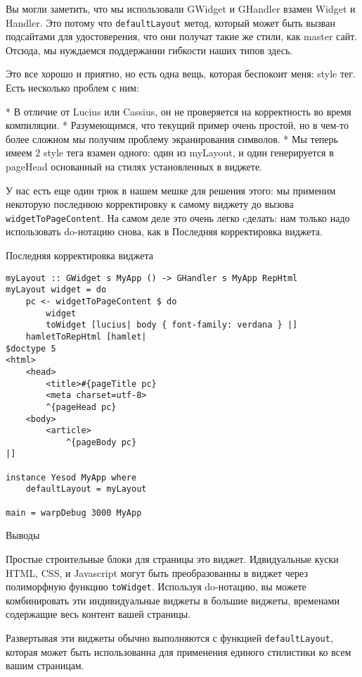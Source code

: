 Вы могли заметить, что мы использовали GWidget и GHandler взамен Widget и Handler. Это потому что \lstinline'defaultLayout' метод, который может быть вызван подсайтами для удостоверения, что они получат такие же стили, как master сайт. Отсюда, мы нуждаемся поддержании гибкости наших типов здесь.

Это все хорошо и приятно, но есть одна вещь, которая беспокоит меня: style тег. Есть несколько проблем с ним:

* В отличие от Lucius или Cassius, он не проверяется на корректность во время компиляции.
* Разумеющимся, что текущий пример очень простой, но в чем-то более сложном мы получим проблему экранирования символов.
* Мы теперь имеем 2 style тега взамен одного: один из myLayout, и один генерируется в pageHead основанный на стилях установленных в виджете.

У нас есть еще один трюк в нашем мешке для решения этого: мы применим некоторую последнюю корректировку к самому виджету до вызова \lstinline'widgetToPageContent'. На самом деле это очень легко cделать: нам только надо использовать do-нотацию снова, как в Последняя корректировка виджета.

Последняя корректировка виджета

\begin{lstlisting}
myLayout :: GWidget s MyApp () -> GHandler s MyApp RepHtml
myLayout widget = do
    pc <- widgetToPageContent $ do
        widget
        toWidget [lucius| body { font-family: verdana } |]
    hamletToRepHtml [hamlet|
$doctype 5
<html>
    <head>
        <title>#{pageTitle pc}
        <meta charset=utf-8>
        ^{pageHead pc}
    <body>
        <article>
            ^{pageBody pc}
|]

instance Yesod MyApp where
    defaultLayout = myLayout

main = warpDebug 3000 MyApp
\end{lstlisting}

Выводы

Простые строительные блоки для страницы это виджет. Идвидуальные куски HTML, CSS, и Javascript могут быть преобразованны в виджет через полиморфную функцию \lstinline'toWidget'. Используя do-нотацию, вы можете комбинировать эти индивидуальные виджеты в большие виджеты, временами содержащие весь контент вашей страницы.

Развертывая эти виджеты обычно выполняются с функцией \lstinline'defaultLayout', которая может быть использованна для применения единого стилистики ко всем вашим страницам.